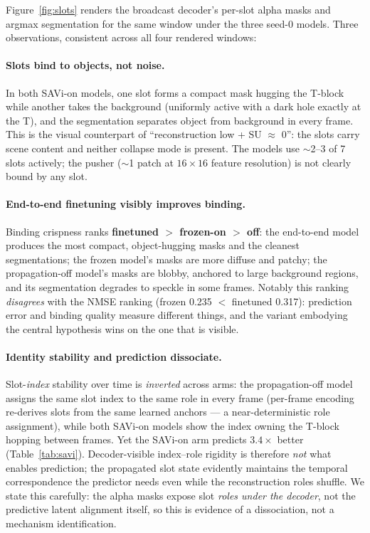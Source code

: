 \documentclass[12pt]{article}
\begin{document}
Figure~\ref{fig:slots} renders the broadcast decoder's per-slot alpha masks and argmax segmentation for the same window under the three seed-0 models. Three observations, consistent across all four rendered windows:

\paragraph{Slots bind to objects, not noise.} In both SAVi-on models, one slot forms a compact mask hugging the T-block while another takes the background (uniformly active with a dark hole exactly at the T), and the segmentation separates object from background in every frame. This is the visual counterpart of ``reconstruction low + SU $\approx$ 0'': the slots carry scene content and neither collapse mode is present. The models use $\sim$2--3 of 7 slots actively; the pusher ($\sim$1 patch at $16 \times 16$ feature resolution) is not clearly bound by any slot.

\paragraph{End-to-end finetuning visibly improves binding.} Binding crispness ranks \textbf{finetuned $>$ frozen-on $>$ off}: the end-to-end model produces the most compact, object-hugging masks and the cleanest segmentations; the frozen model's masks are more diffuse and patchy; the propagation-off model's masks are blobby, anchored to large background regions, and its segmentation degrades to speckle in some frames. Notably this ranking \emph{disagrees} with the NMSE ranking (frozen 0.235 $<$ finetuned 0.317): prediction error and binding quality measure different things, and the variant embodying the central hypothesis wins on the one that is visible.

\paragraph{Identity stability and prediction dissociate.} Slot-\emph{index} stability over time is \emph{inverted} across arms: the propagation-off model assigns the same slot index to the same role in every frame (per-frame encoding re-derives slots from the same learned anchors --- a near-deterministic role assignment), while both SAVi-on models show the index owning the T-block hopping between frames. Yet the SAVi-on arm predicts $3.4\times$ better (Table~\ref{tab:savi}). Decoder-visible index--role rigidity is therefore \emph{not} what enables prediction; the propagated slot state evidently maintains the temporal correspondence the predictor needs even while the reconstruction roles shuffle. We state this carefully: the alpha masks expose slot \emph{roles under the decoder}, not the predictive latent alignment itself, so this is evidence of a dissociation, not a mechanism identification.
\end{document}
